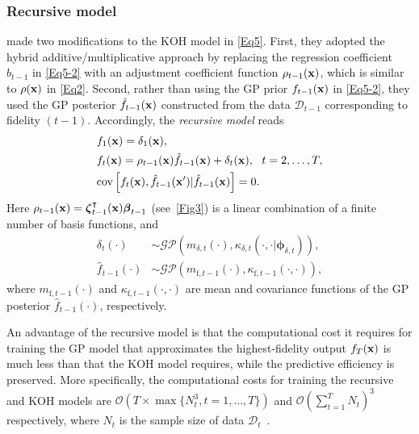 \documentclass[iicol,sn-basic]{sn-jnl}%
\begin{document}
\subsubsection{Recursive model}\label{Sec423}

\cite{Gratiet2014} made two modifications to the KOH model in \cref{Eq5}.
First, they adopted the hybrid additive/multiplicative approach by replacing the regression coefficient $b_{t-1}$ in \cref{Eq5-2} with an adjustment coefficient function $\rho_{t-1}({\bf x})$, which is similar to $\rho({\bf x})$ in \cref{Eq2}.
Second, rather than using the GP prior $f_{t-1}({\bf x})$ in \cref{Eq5-2}, they used the GP posterior $\hat{f}_{t-1}({\bf x})$ constructed from the data $\mathcal{D}_{t-1}$ corresponding to fidelity $(t-1)$.
Accordingly, the \textit{recursive model} reads
\begin{subequations}\label{Eq13}
	\begin{align}
		& f_1({\bf x}) = \delta_1({\bf x}), \label{Eq13-1}\\
		& f_t({\bf x}) =
		\rho_{t-1}({\bf x}) \hat{f}_{t-1}({\bf x}) + \delta_{t}({\bf x}), \ \ t=2,\dots,T \label{Eq13-2},\\
		&\text{cov}\left[f_{t}({\bf x}),\hat{f}_{t-1}({\bf x}')|\hat{f}_{t-1}({\bf x})\right]=0 
		\label{Eq13-3}.
	\end{align}
\end{subequations}
Here $\rho_{t-1}({\bf x}) = {\boldsymbol \zeta}_{t-1}^\intercal({\bf x}) {\boldsymbol \beta}_{t-1}$ (see~\cref{Fig3}) is a linear combination of a finite number of basis functions, and
\begin{subequations}\label{Eq14}
	\begin{align}
		\delta_{t}(\cdot) & \sim \mathcal{GP}\left(m_{\delta,t}(\cdot),\kappa_{\delta,t}(\cdot,\cdot|{\boldsymbol \phi}_{\delta,t})\right)
		\label{Eq14-1},\\
		\hat{f}_{t-1}(\cdot) & \sim \mathcal{GP}\left(m_{\text{f},t-1}(\cdot),\kappa_{\text{f},t-1}(\cdot,\cdot)\right) 
		\label{Eq14-2},
	\end{align}
\end{subequations}
where $m_{\text{f},t-1}(\cdot)$ and $\kappa_{\text{f},t-1}(\cdot,\cdot)$ are mean and covariance functions of the GP posterior $\hat{f}_{t-1}(\cdot)$, respectively.

An advantage of the recursive model is that the computational cost it requires for training the GP model that approximates the highest-fidelity output $f_T({\bf x})$ is much less than that the KOH model requires, while the predictive efficiency is preserved.
More specifically, the computational costs for training the recursive and KOH models are $\mathcal{O}\left(T \times \max\{N_t^3,t=1,\dots,T\}\right)$ and $\mathcal{O}(\sum_{t=1}^T N_t)^3$ respectively, where $N_t$ is the sample size of data $\mathcal{D}_t$~\citep{Gratiet2014}. 
\end{document}
